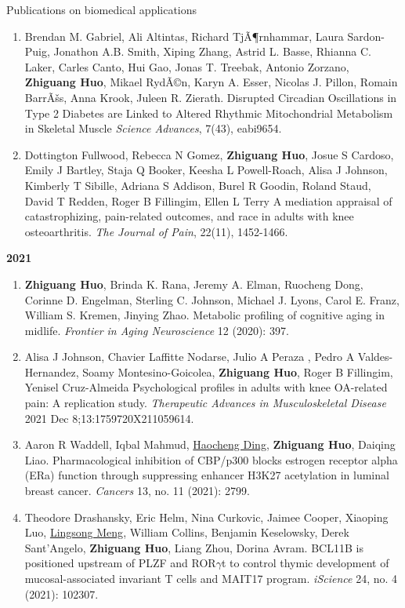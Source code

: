 \documentclass{resume} %
\begin{document}
\begin{rSection}{Publications on biomedical applications}
\begin{enumerate}[noitemsep,topsep=0pt, resume]
\item  
Brendan M. Gabriel, Ali Altintas, Richard TjÃ¶rnhammar, Laura Sardon-Puig, Jonathon A.B. Smith, Xiping Zhang, Astrid L. Basse, Rhianna C. Laker, Carles Canto, Hui Gao, Jonas T. Treebak, Antonio Zorzano, {\bf Zhiguang Huo}, Mikael RydÃ©n, Karyn A. Esser, Nicolas J. Pillon, Romain BarrÃšs, Anna Krook, Juleen R. Zierath. 
Disrupted Circadian Oscillations in Type 2 Diabetes are Linked to Altered Rhythmic Mitochondrial Metabolism in Skeletal Muscle
\emph{Science Advances}, 7(43), eabi9654.

\item  
Dottington Fullwood, Rebecca N Gomez, {\bf Zhiguang Huo}, Josue S Cardoso, Emily J Bartley, Staja Q Booker, Keesha L Powell-Roach, Alisa J Johnson, Kimberly T Sibille, Adriana S Addison, Burel R Goodin, Roland Staud, David T Redden, Roger B Fillingim, Ellen L Terry
A mediation appraisal of catastrophizing, pain-related outcomes, and race in adults with knee osteoarthritis. 
\emph{The Journal of Pain}, 22(11), 1452-1466.

\end{enumerate}


\textbf{2021}
\begin{enumerate}[noitemsep,topsep=0pt, resume]

\item  {\bf Zhiguang Huo}, Brinda K. Rana, Jeremy A. Elman, Ruocheng Dong, Corinne D. Engelman, Sterling C. Johnson, Michael J. Lyons, Carol E. Franz, William S. Kremen, Jinying Zhao.
Metabolic profiling of cognitive aging in midlife.
\emph{Frontier in Aging Neuroscience} 12 (2020): 397.

\item
Alisa J Johnson, Chavier Laffitte Nodarse, Julio A Peraza , Pedro A Valdes-Hernandez, Soamy Montesino-Goicolea, {\bf Zhiguang Huo}, Roger B Fillingim, Yenisel Cruz-Almeida
Psychological profiles in adults with knee OA-related pain: A replication study.
\emph{Therapeutic Advances in Musculoskeletal Disease} 2021 Dec 8;13:1759720X211059614.


\item
Aaron R Waddell, Iqbal Mahmud, \underline{Haocheng Ding}, {\bf Zhiguang Huo}, Daiqing Liao. 
Pharmacological inhibition of CBP/p300 blocks estrogen receptor alpha (ERa) function through suppressing enhancer H3K27 acetylation in luminal breast cancer.
\emph{Cancers} 13, no. 11 (2021): 2799.

\item
Theodore Drashansky, Eric Helm, Nina Curkovic, Jaimee Cooper, Xiaoping Luo, \underline{Lingsong Meng}, William Collins, Benjamin Keselowsky, Derek Sant'Angelo, {\bf Zhiguang Huo}, Liang Zhou, Dorina Avram.
BCL11B is positioned upstream of PLZF and ROR$\gamma$t to control thymic development of mucosal-associated invariant T cells and MAIT17 program.
\emph{iScience}  24, no. 4 (2021): 102307.


\end{enumerate}
\end{rSection}
\end{document}
